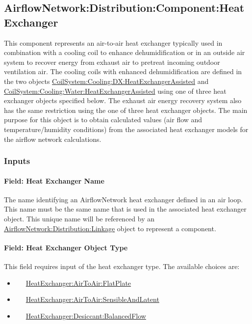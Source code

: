 \subsection{AirflowNetwork:Distribution:Component:HeatExchanger}\label{airflownetworkdistributioncomponentheatexchanger}

This component represents an air-to-air heat exchanger typically used in combination with a cooling coil to enhance dehumidification or in an outside air system to recover energy from exhaust air to pretreat incoming outdoor ventilation air. The cooling coils with enhanced dehumidification are defined in the two objects \hyperref[coilsystemcoolingdxheatexchangerassisted]{CoilSystem:Cooling:DX:HeatExchangerAssisted} and \hyperref[coilsystemcoolingwaterheatexchangerassisted]{CoilSystem:Cooling:Water:HeatExchangerAssisted} using one of three heat exchanger objects specified below. The exhaust air energy recovery system also has the same restriction using the one of three heat exchanger objects. The main purpose for this object is to obtain calculated values (air flow and temperature/humidity conditions) from the associated heat exchanger models for the airflow network calculations.

\subsubsection{Inputs}\label{inputs-18}

\paragraph{Field: Heat Exchanger Name}\label{field-heat-exchanger-name}

The name identifying an AirflowNetwork heat exchanger defined in an air loop. This name must be the same name that is used in the associated heat exchanger object. This unique name will be referenced by an \hyperref[airflownetworkdistributionlinkage]{AirflowNetwork:Distribution:Linkage} object to represent a component.

\paragraph{Field: Heat Exchanger Object Type}\label{field-heat-exchanger-object-type}

This field requires input of the heat exchanger type. The available choices are:

\begin{itemize}
\item
  ~~~\hyperref[heatexchangerairtoairflatplate]{HeatExchanger:AirToAir:FlatPlate}
\item
  ~~~\hyperref[heatexchangerairtoairsensibleandlatent]{HeatExchanger:AirToAir:SensibleAndLatent}
\item
  ~~~\hyperref[heatexchangerdesiccantbalancedflow]{HeatExchanger:Desiccant:BalancedFlow}
\end{itemize}


